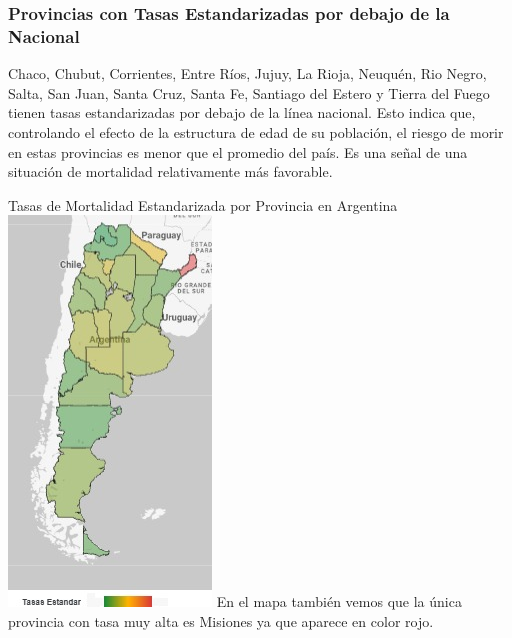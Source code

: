 \documentclass[
]{article}
\begin{document}
\subsubsection{Provincias con Tasas Estandarizadas por debajo de la
Nacional}\label{provincias-con-tasas-estandarizadas-por-debajo-de-la-nacional}

Chaco, Chubut, Corrientes, Entre Ríos, Jujuy, La Rioja, Neuquén, Rio
Negro, Salta, San Juan, Santa Cruz, Santa Fe, Santiago del Estero y
Tierra del Fuego tienen tasas estandarizadas por debajo de la línea
nacional. Esto indica que, controlando el efecto de la estructura de
edad de su población, el riesgo de morir en estas provincias es menor
que el promedio del país. Es una señal de una situación de mortalidad
relativamente más favorable.

Tasas de Mortalidad Estandarizada por Provincia en Argentina
\includegraphics{mapa_tasas.jpeg} En el mapa también vemos que la única
provincia con tasa muy alta es Misiones ya que aparece en color rojo.
\end{document}

